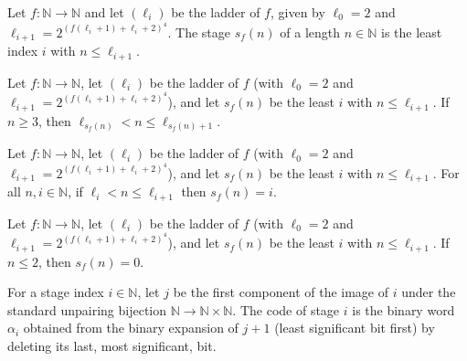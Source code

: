 \begin{definition}
\label{Turing.NTimeDiag.stage}
\leanok
{}
Let $f : \mathbb{N} \to \mathbb{N}$ and let $(\ell_i)$ be the ladder of $f$, given by
$\ell_0 = 2$ and $\ell_{i+1} = 2^{(f(\ell_i+1) + \ell_i + 2)^4}$. The stage $s_f(n)$ of a length
$n \in \mathbb{N}$ is the least index $i$ with $n \le \ell_{i+1}$.
\end{definition}

\begin{theorem}
\label{Turing.NTimeDiag.stage_spec}
\leanok
{}
Let $f : \mathbb{N} \to \mathbb{N}$, let $(\ell_i)$ be the ladder of $f$ (with $\ell_0 = 2$ and
$\ell_{i+1} = 2^{(f(\ell_i+1) + \ell_i + 2)^4}$), and let $s_f(n)$ be the least $i$ with
$n \le \ell_{i+1}$. If $n \ge 3$, then $\ell_{s_f(n)} < n \le \ell_{s_f(n)+1}$.
\end{theorem}

\begin{theorem}
\label{Turing.NTimeDiag.stage_eq}
\leanok
{}
Let $f : \mathbb{N} \to \mathbb{N}$, let $(\ell_i)$ be the ladder of $f$ (with $\ell_0 = 2$ and
$\ell_{i+1} = 2^{(f(\ell_i+1) + \ell_i + 2)^4}$), and let $s_f(n)$ be the least $i$ with
$n \le \ell_{i+1}$. For all $n, i \in \mathbb{N}$, if $\ell_i < n \le \ell_{i+1}$ then
$s_f(n) = i$.
\end{theorem}

\begin{theorem}
\label{Turing.NTimeDiag.stage_of_le_two}
\leanok
{}
Let $f : \mathbb{N} \to \mathbb{N}$, let $(\ell_i)$ be the ladder of $f$ (with $\ell_0 = 2$ and
$\ell_{i+1} = 2^{(f(\ell_i+1) + \ell_i + 2)^4}$), and let $s_f(n)$ be the least $i$ with
$n \le \ell_{i+1}$. If $n \le 2$, then $s_f(n) = 0$.
\end{theorem}

\begin{definition}
\label{Turing.NTimeDiag.stageCode}
\leanok
For a stage index $i \in \mathbb{N}$, let $j$ be the first component of the image of $i$ under the
standard unpairing bijection $\mathbb{N} \to \mathbb{N} \times \mathbb{N}$. The code of stage $i$
is the binary word $\alpha_i$ obtained from the binary expansion of $j + 1$ (least significant
bit first) by deleting its last, most significant, bit.
\end{definition}

